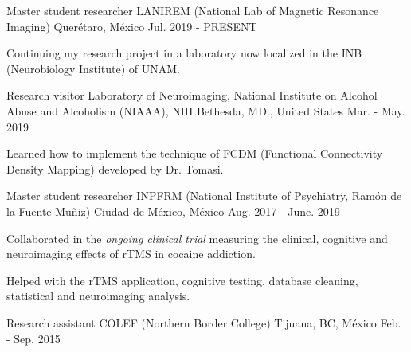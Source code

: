 \vspace{-3.2mm}
\vspace{-1.5mm}
\begin{cventries}
    \cventry
        {Master student researcher}
        {LANIREM (National Lab of Magnetic Resonance Imaging)}
        {Querétaro, México}
        {Jul. 2019 - PRESENT}
        {
            \begin{cvitems}
                \item {Continuing my research project in a laboratory now localized in the INB (Neurobiology Institute) of UNAM.}
            \end{cvitems}
        }
    \cventry
        {Research visitor}
        {Laboratory of Neuroimaging, National Institute on Alcohol Abuse and Alcoholism (NIAAA), NIH}
        {Bethesda, MD., United States}
        {Mar. - May. 2019}
        {
            \begin{cvitems}
                \item {Learned how to implement the technique of FCDM (Functional Connectivity Density Mapping) developed by Dr. Tomasi.}
            \end{cvitems}
        }
    \cventry
        {Master student researcher}
        {INPFRM (National Institute of Psychiatry, Ramón de la Fuente Muñiz)}
        {Ciudad de México, México}
        {Aug. 2017 - June. 2019}
        {
            \begin{cvitems}
            \item {Collaborated in the \href{https://clinicaltrials.gov/ct2/show/study/NCT02986438?term=Jorge+Gonzalez-Olvera&cntry=MX&rank=2}{\textit{ongoing clinical trial}} measuring the clinical, cognitive and neuroimaging effects of rTMS in cocaine addiction.}
            \item {Helped with the rTMS application, cognitive testing, database cleaning, statistical and neuroimaging analysis.}
            \end{cvitems}
        }
    \cventry
        {Research assistant}
        {COLEF (Northern Border College)}
        {Tijuana, BC, México}
        {Feb. - Sep. 2015}
        {
            \begin{cvitems}
            \item {Collaborated in the questionnaires applications and data capturing in the project 
            \end{cvitems}
        }
\end{cventries}
